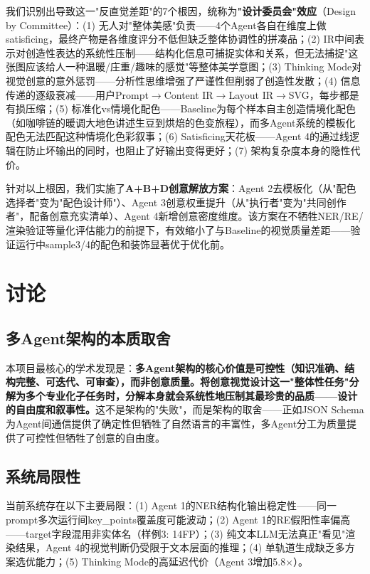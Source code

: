 \documentclass[11pt,a4paper]{article}
\begin{document}
我们识别出导致这一"反直觉差距"的7个根因，统称为\textbf{"设计委员会"效应}（Design by Committee）：(1) 无人对"整体美感"负责——4个Agent各自在维度上做satisficing，最终产物是各维度评分不低但缺乏整体协调性的拼凑品；(2) IR中间表示对创造性表达的系统性压制——结构化信息可捕捉实体和关系，但无法捕捉"这张图应该给人一种温暖/庄重/趣味的感觉"等整体美学意图；(3) Thinking Mode对视觉创意的意外惩罚——分析性思维增强了严谨性但削弱了创造性发散；(4) 信息传递的逐级衰减——用户Prompt$\rightarrow$Content IR$\rightarrow$Layout IR$\rightarrow$SVG，每步都是有损压缩；(5) 标准化vs情境化配色——Baseline为每个样本自主创造情境化配色（如咖啡链的暖调大地色讲述生豆到烘焙的色变旅程），而多Agent系统的模板化配色无法匹配这种情境化色彩叙事；(6) Satisficing天花板——Agent 4的通过线逻辑在防止坏输出的同时，也阻止了好输出变得更好；(7) 架构复杂度本身的隐性代价。

针对以上根因，我们实施了\textbf{A+B+D创意解放方案}：Agent 2去模板化（从"配色选择者"变为"配色设计师"）、Agent 3创意权重提升（从"执行者"变为"共同创作者"，配备创意充实清单）、Agent 4新增创意密度维度。该方案在不牺牲NER/RE/渲染验证等量化评估能力的前提下，有效缩小了与Baseline的视觉质量差距——验证运行中sample3/4的配色和装饰显著优于优化前。

\section{讨论}

\subsection{多Agent架构的本质取舍}

本项目最核心的学术发现是：\textbf{多Agent架构的核心价值是可控性（知识准确、结构完整、可迭代、可审查），而非创意质量。将创意视觉设计这一"整体性任务"分解为多个专业化子任务时，分解本身就会系统性地压制其最珍贵的品质——设计的自由度和叙事性。}这不是架构的"失败"，而是架构的取舍——正如JSON Schema为Agent间通信提供了确定性但牺牲了自然语言的丰富性，多Agent分工为质量提供了可控性但牺牲了创意的自由度。

\subsection{系统局限性}

当前系统存在以下主要局限：(1) Agent 1的NER结构化输出稳定性——同一prompt多次运行间key\_points覆盖度可能波动；(2) Agent 1的RE假阳性率偏高——target字段混用非实体名（样例3: 14FP）；(3) 纯文本LLM无法真正"看见"渲染结果，Agent 4的视觉判断仍受限于文本层面的推理；(4) 单轨道生成缺乏多方案选优能力；(5) Thinking Mode的高延迟代价（Agent 3增加5.8$\times$）。
\end{document}
